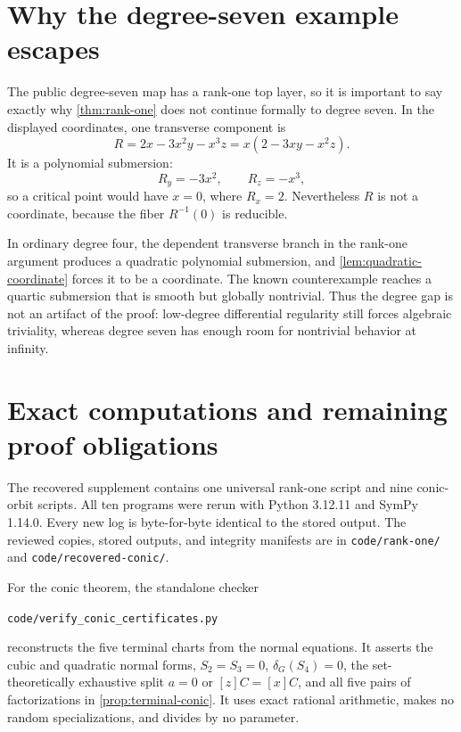 \documentclass[11pt,reqno]{amsart}
\begin{document}
\section{Why the degree-seven example escapes}
\label{sec:degree-seven-escape}

The public degree-seven map has a rank-one top layer, so it is important to
say exactly why \cref{thm:rank-one} does not continue formally to degree
seven.  In the displayed coordinates, one transverse component is
\[
R=2x-3x^2y-x^3z=x(2-3xy-x^2z).
\]
It is a polynomial submersion:
\[
R_y=-3x^2,\qquad R_z=-x^3,
\]
so a critical point would have \(x=0\), where \(R_x=2\).  Nevertheless
\(R\) is not a coordinate, because the fiber \(R^{-1}(0)\) is reducible.

In ordinary degree four, the dependent transverse branch in the rank-one
argument produces a quadratic polynomial submersion, and
\cref{lem:quadratic-coordinate} forces it to be a coordinate.  The known
counterexample reaches a quartic submersion that is smooth but globally
nontrivial.  Thus the degree gap is not an artifact of the proof:
low-degree differential regularity still forces algebraic triviality,
whereas degree seven has enough room for nontrivial behavior at infinity.

\section{Exact computations and remaining proof obligations}
\label{sec:computation}

The recovered supplement contains one universal rank-one script and nine
conic-orbit scripts.  All ten programs were rerun with Python 3.12.11 and
SymPy 1.14.0.  Every new log is byte-for-byte identical to the stored output.
The reviewed copies, stored outputs, and integrity manifests are in
\texttt{code/rank-one/} and \texttt{code/recovered-conic/}.

For the conic theorem, the standalone checker
\begin{center}
\texttt{code/verify\_conic\_certificates.py}
\end{center}
reconstructs the five terminal charts from the normal equations.  It asserts
the cubic and quadratic normal forms, \(S_2=S_3=0\),
\(\delta_G(S_4)=0\), the set-theoretically exhaustive split \(a=0\) or
\([z]C=[x]C\), and all five pairs of factorizations in
\cref{prop:terminal-conic}.  It uses exact rational arithmetic, makes no
random specializations, and divides by no parameter.
\end{document}
